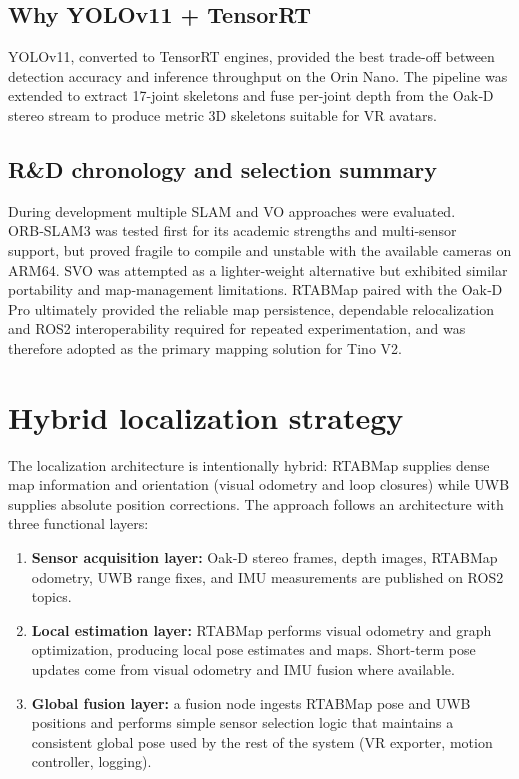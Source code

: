 \subsection*{Why YOLOv11 + TensorRT}
YOLOv11, converted to TensorRT engines, provided the best trade-off between detection accuracy and inference throughput on the Orin Nano. The pipeline was extended to extract 17-joint skeletons and fuse per-joint depth from the Oak‑D stereo stream to produce metric 3D skeletons suitable for VR avatars.

\subsection*{R\&D chronology and selection summary}
During development multiple SLAM and VO approaches were evaluated. ORB‑SLAM3 was tested first for its academic strengths and multi‑sensor support, but proved fragile to compile and unstable with the available cameras on ARM64. SVO was attempted as a lighter‑weight alternative but exhibited similar portability and map‑management limitations. RTABMap paired with the Oak‑D Pro ultimately provided the reliable map persistence, dependable relocalization and ROS2 interoperability required for repeated experimentation, and was therefore adopted as the primary mapping solution for Tino V2.

\section{Hybrid localization strategy}

The localization architecture is intentionally hybrid: RTABMap supplies dense map information and orientation (visual odometry and loop closures) while UWB supplies absolute position corrections. The approach follows an architecture with three functional layers:

\begin{enumerate}
	\item \textbf{Sensor acquisition layer:} Oak‑D stereo frames, depth images, RTABMap odometry, UWB range fixes, and IMU measurements are published on ROS2 topics.
	\item \textbf{Local estimation layer:} RTABMap performs visual odometry and graph optimization, producing local pose estimates and maps. Short-term pose updates come from visual odometry and IMU fusion where available.
	\item \textbf{Global fusion layer:} a fusion node ingests RTABMap pose and UWB positions and performs simple sensor selection logic that maintains a consistent global pose used by the rest of the system (VR exporter, motion controller, logging).
\end{enumerate}

